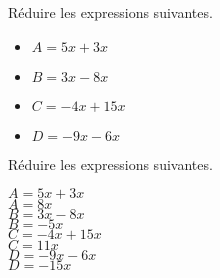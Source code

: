 \begin{exercice*}
    Réduire les expressions suivantes.
    \begin{multicols}{2}
        \begin{itemize}
            \item[] $A=5x+3x$
            \item[] $B=3x-8x$
            \item[] $C=-4x+15x$
            \item[] $D=-9x-6x$
        \end{itemize}
    \end{multicols}    
\end{exercice*}
\begin{corrige}
    Réduire les expressions suivantes.
    \begin{multicols}{2}
        \begin{itemize}
            \def\item{}
            \item $A=5x+3x$\\
            {\red $A=8x$}\\\smallskip
            \item $B=3x-8x$\\
            {\red $B=-5x$}\\\smallskip
            \item $C=-4x+15x$\\
            {\red $C=11x$}\\\smallskip
            \item $D=-9x-6x$\\
            {\red $D=-15x$}            
        \end{itemize}
    \end{multicols}
\end{corrige}

